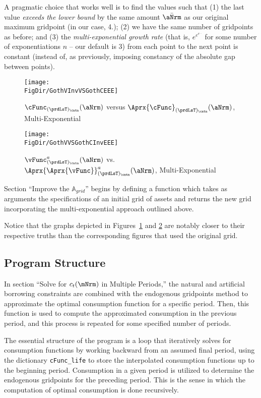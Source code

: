 \documentclass[\econtexRoot/SolvingMicroDSOPs]{subfiles}
\begin{document}
A pragmatic choice that works well is to find the values such that (1) the last value \textit{exceeds the lower bound} by the same amount $\bar\aNrm$ as our original maximum gridpoint (in our case, 4.); (2) we have the same number of gridpoints as before; and (3) the \textit{multi-exponential growth rate} (that is, $e^{e^{e^{...}}}$ for some number of exponentiations $n$ -- our default is 3) from each point to the next point is constant (instead of, as previously, imposing constancy of the absolute gap between points).

\hypertarget{GothVInvVSGothCEEE}{}
\begin{figure}
  \centerline{\texttt{[image: \\FigDir/GothVInvVSGothCEEE]}}
  \caption{$\cFunc_{({\prdLsT})_\cntn}(\aNrm)$ versus
    $\Aprx{\cFunc}_{({\prdLsT})_\cntn}(\aNrm)$, Multi-Exponential }
  \label{fig:GothVInvVSGothCEE}
\end{figure}


\hypertarget{GothVVSGothCInvEEE}{}
\begin{figure}
  \texttt{[image: \\FigDir/GothVVSGothCInvEEE]}
  \caption{$\vFunc^{{a}}_{({\prdLsT})_\cntn}(\aNrm)$ vs.
    $\Aprx{\Aprx{\vFunc}}_{({\prdLsT})_\cntn}^{{a}}(\aNrm)$, Multi-Exponential }
  \label{fig:GothVVSGothCInvEE}
\end{figure}

Section ``Improve the $\mathbb{A}_{grid}$'' begins by defining a function which takes as arguments the specifications of an initial grid of assets and returns the new grid incorporating the multi-exponential approach outlined above.


Notice that the graphs depicted in Figures~\ref{fig:GothVInvVSGothCEE} and \ref{fig:GothVVSGothCInvEE} are notably closer to their respective truths than the corresponding figures that used the original grid.

\subsection{Program Structure}

In section ``Solve for $c_t(\mNrm)$ in Multiple Periods,'' the natural and artificial borrowing constraints are combined with the endogenous gridpoints method to approximate the optimal consumption function for a specific period. Then, this function is used to compute the approximated consumption in the previous period, and this process is repeated for some specified number of periods.

The essential structure of the program is a loop that iteratively solves for consumption functions by working backward from an assumed final period, using the dictionary \texttt{cFunc\_life} to store the interpolated consumption functions up to the beginning period. Consumption in a given period is utilized to determine the endogenous gridpoints for the preceding period. This is the sense in which the computation of optimal consumption is done recursively.
\end{document}
